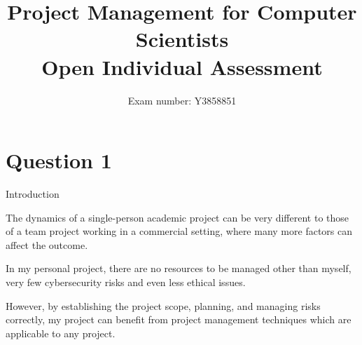 \documentclass[12pt]{article}
\begin{document}
\author{Exam number: Y3858851}
\title{Project Management for Computer Scientists \\ {\large Open Individual Assessment}}
\date{}
\maketitle
\section*{Question 1} 

Introduction

The dynamics of a single-person academic project can be very different to those of a team project working in a commercial setting, where many more factors can affect the outcome.

In my personal project, there are no resources to be managed other than myself, very few cybersecurity risks and even less ethical issues.

However, by establishing the project scope, planning, and managing risks correctly, my project can benefit from project management techniques which are applicable to any project.
\end{document}
